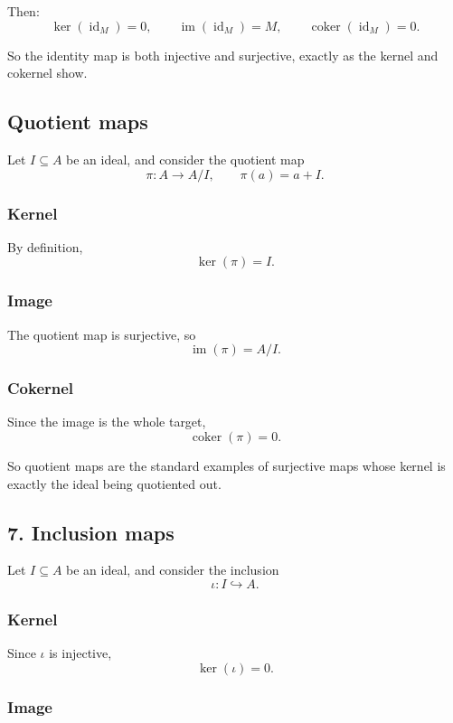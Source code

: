 \documentclass[12pt,a4paper]{article}
\theoremstyle{notespace}
\theoremstyle{definition}
\begin{document}
Then:
\[
\ker(\operatorname{id}_M)=0,
\qquad
\operatorname{im}(\operatorname{id}_M)=M,
\qquad
\operatorname{coker}(\operatorname{id}_M)=0.
\]

So the identity map is both injective and surjective, exactly as the kernel and cokernel show.

\subsection{ Quotient maps}

Let \(I\subseteq A\) be an ideal, and consider the quotient map
\[
\pi:A\longrightarrow A/I,
\qquad
\pi(a)=a+I.
\]

\subsubsection*{Kernel}

By definition,
\[
\ker(\pi)=I.
\]

\subsubsection*{Image}

The quotient map is surjective, so
\[
\operatorname{im}(\pi)=A/I.
\]

\subsubsection*{Cokernel}

Since the image is the whole target,
\[
\operatorname{coker}(\pi)=0.
\]

So quotient maps are the standard examples of surjective maps whose kernel is exactly the ideal being quotiented out.

\subsection{7. Inclusion maps}

Let \(I\subseteq A\) be an ideal, and consider the inclusion
\[
\iota:I\hookrightarrow A.
\]

\subsubsection*{Kernel}

Since \(\iota\) is injective,
\[
\ker(\iota)=0.
\]

\subsubsection*{Image}
\end{document}
